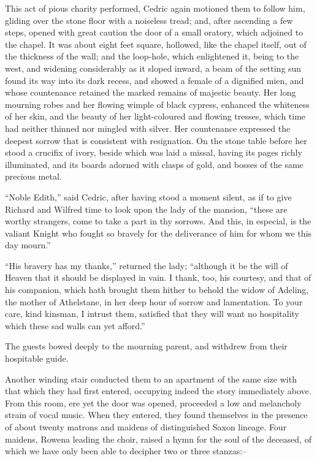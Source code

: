 This act of pious charity performed, Cedric again motioned them to
follow him, gliding over the stone floor with a noiseless tread; and,
after ascending a few steps, opened with great caution the door of a
small oratory, which adjoined to the chapel. It was about eight feet
square, hollowed, like the chapel itself, out of the thickness of the
wall; and the loop-hole, which enlightened it, being to the west, and
widening considerably as it sloped inward, a beam of the setting sun
found its way into its dark recess, and showed a female of a dignified
mien, and whose countenance retained the marked remains of majestic
beauty. Her long mourning robes and her flowing wimple of black cypress,
enhanced the whiteness of her skin, and the beauty of her light-coloured
and flowing tresses, which time had neither thinned nor mingled with
silver. Her countenance expressed the deepest sorrow that is consistent
with resignation. On the stone table before her stood a crucifix of
ivory, beside which was laid a missal, having its pages richly
illuminated, and its boards adorned with clasps of gold, and bosses of
the same precious metal.

``Noble Edith,'' said Cedric, after having stood a moment silent, as if
to give Richard and Wilfred time to look upon the lady of the mansion,
``these are worthy strangers, come to take a part in thy sorrows. And
this, in especial, is the valiant Knight who fought so bravely for the
deliverance of him for whom we this day mourn.''

``His bravery has my thanks,'' returned the lady; ``although it be the
will of Heaven that it should be displayed in vain. I thank, too, his
courtesy, and that of his companion, which hath brought them hither to
behold the widow of Adeling, the mother of Athelstane, in her deep hour
of sorrow and lamentation. To your care, kind kinsman, I intrust them,
satisfied that they will want no hospitality which these sad walls can
yet afford.''

The guests bowed deeply to the mourning parent, and withdrew from their
hospitable guide.

Another winding stair conducted them to an apartment of the same size
with that which they had first entered, occupying indeed the story
immediately above. From this room, ere yet the door was opened,
proceeded a low and melancholy strain of vocal music. When they entered,
they found themselves in the presence of about twenty matrons and
maidens of distinguished Saxon lineage. Four maidens, Rowena leading the
choir, raised a hymn for the soul of the deceased, of which we have only
been able to decipher two or three stanzas:--

